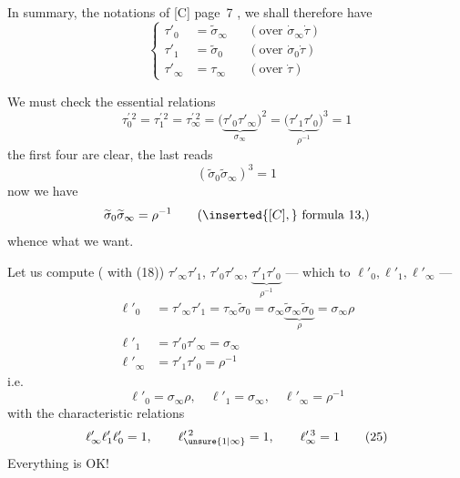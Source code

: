 

In summary,  the notations of [C]  page~7 , we shall therefore have
\[
\left\{
\begin{aligned}
\tau'_0&=\widetilde{\sigma}_\infty &&(\text{over }\dot{\sigma}_\infty\dot{\tau})\\
\tau'_1&=\widetilde{\sigma}_0 &&(\text{over }\dot{\sigma}_0\dot{\tau})\\
\tau'_\infty&=\tau_\infty &&(\text{over }\dot{\tau})
\end{aligned}
\right.
\tag{22}
\]

We must check the essential relations
\[
\tau_0^{\prime\,2}=\tau_1^{\prime\,2}=\tau_\infty^{\prime\,2}
=\bigl(\underbrace{\tau'_0\tau'_\infty}_{\sigma_\infty}\bigr)^2
=\bigl(\underbrace{\tau'_1\tau'_0}_{\rho^{-1}}\bigr)^3=1
\tag{23}
\]
the first four are clear, the last reads
\[
(\widetilde{\sigma}_0\widetilde{\sigma}_\infty)^3=1
\]
now we have
\[
\widetilde{\sigma}_0\widetilde{\sigma}_\infty=\rho^{-1}
\qquad (\inserted{[C],}\ \text{formula 13,})
\]
whence what we want.

Let us compute ( with (18)) $\tau'_\infty\tau'_1$, $\tau'_0\tau'_\infty$, $\underbrace{\tau'_1\tau'_0}_{\rho^{-1}}$ --- which  to $\ell'_0,\ell'_1,\ell'_\infty$ ---
\[
\begin{aligned}
\ell'_0&=\tau'_\infty\tau'_1=\tau_\infty\widetilde{\sigma}_0
=\sigma_\infty\underbrace{\widetilde{\sigma}_\infty\widetilde{\sigma}_0}_{\rho}
=\sigma_\infty\rho\\
\ell'_1&=\tau'_0\tau'_\infty=\sigma_\infty\\
\ell'_\infty&=\tau'_1\tau'_0=\rho^{-1}
\end{aligned}
\]
i.e.
\[
\ell'_0=\sigma_\infty\rho,\quad \ell'_1=\sigma_\infty,\quad \ell'_\infty=\rho^{-1}
\tag{24}
\]
with the characteristic relations
\[
\ell'_\infty\ell'_1\ell'_0=1,\qquad \ell_{\unsure{1|\infty}}^{\prime\,2}=1,\qquad \ell_\infty^{\prime\,3}=1
\tag{25}
\]
Everything is OK!

